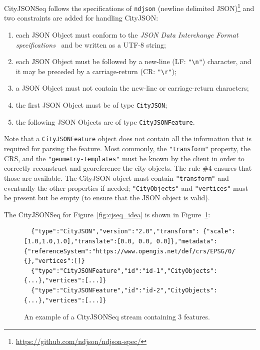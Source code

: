 \documentclass{isprs} %
\begin{document}
CityJSONSeq follows the specifications of \texttt{ndjson} (newline delimited JSON)\footnote{\url{https://github.com/ndjson/ndjson-spec/}} and two constraints are added for handling CityJSON\@:
\begin{enumerate}
  \item each JSON Object must conform to the \emph{JSON Data Interchange Format specifications}~\citep{IETF-JSON} and be written as a UTF-8 string;
  \item each JSON Object must be followed by a new-line (LF: \texttt{"\textbackslash n"}) character, and it may be preceded by a carriage-return (CR: \texttt{"\textbackslash r"});
  \item a JSON Object must not contain the new-line or carriage-return characters;
  \item the first JSON Object must be of type \texttt{CityJSON};
  \item the following JSON Objects are of type \texttt{CityJSONFeature}.
\end{enumerate}

Note that a \texttt{CityJSONFeature} object does not contain all the information that is required for parsing the feature. 
Most commonly, the \texttt{"transform"} property, the CRS, and the \texttt{"geometry-templates"} must be known by the client in order to correctly reconstruct and georeference the city objects. 
The rule \#4 ensures that those are available. 
The CityJSON object must contain \texttt{"transform"} and eventually the other properties if needed; \texttt{"CityObjects"} and \texttt{"vertices"} must be present but be empty (to ensure that the JSON object is valid).

%

The CityJSONSeq for Figure~\ref{fig:cjseq_idea} is shown in Figure~\ref{fig:stream}:
\begin{figure}
  \begin{lstlisting}
  {"type":"CityJSON","version":"2.0","transform": {"scale":[1.0,1.0,1.0],"translate":[0.0, 0.0, 0.0]},"metadata":{"referenceSystem":"https://www.opengis.net/def/crs/EPSG/0/7415"},"CityObjects":{},"vertices":[]}
  {"type":"CityJSONFeature","id":"id-1","CityObjects":{...},"vertices":[...]} 
  {"type":"CityJSONFeature","id":"id-2","CityObjects":{...},"vertices":[...]} 
  \end{lstlisting}
\caption{An example of a CityJSONSeq stream containing 3 features.}%
\label{fig:stream}
\end{figure}
\end{document}
